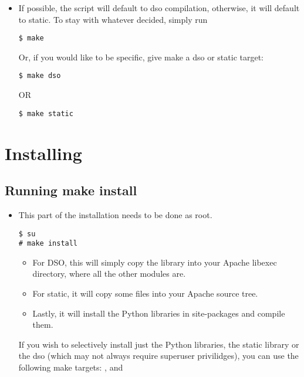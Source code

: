\begin{itemize}

\item
If possible, the  script will default to dso
compilation, otherwise, it will default to static. To stay with
whatever  decided, simply run
\begin{verbatim}
$ make
\end{verbatim}

Or, if you would like to be specific, give make a dso or static target: 
\begin{verbatim}
$ make dso
\end{verbatim}
OR
\begin{verbatim}
$ make static
\end{verbatim}

\end{itemize}

\section{Installing\label{inst-installing}}

\subsection{Running make install\label{inst-makeinstall}}

\begin{itemize}

\item
This part of the installation needs to be done as root. 
\begin{verbatim}
$ su
# make install
\end{verbatim}
                      
\begin{itemize}

\item
For DSO, this will simply copy the library into your Apache libexec
directory, where all the other modules are.  

\item
For static, it will copy some files into your Apache source tree.

\item
Lastly, it will install the Python libraries in site-packages and
compile them. 

 \end{itemize} 

 If you wish to selectively install just the Python libraries,
the static library or the dso (which may not always require superuser
privilidges), you can use the following make targets:
,
 and 

\end{itemize}

